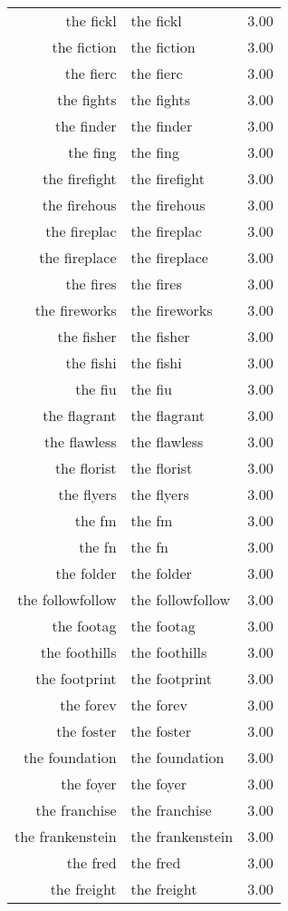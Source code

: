 \begin{table}[ht]
\begin{tabular}{rlr}
  the fickl & the fickl & 3.00 \\ 
  the fiction & the fiction & 3.00 \\ 
  the fierc & the fierc & 3.00 \\ 
  the fights & the fights & 3.00 \\ 
  the finder & the finder & 3.00 \\ 
  the fing & the fing & 3.00 \\ 
  the firefight & the firefight & 3.00 \\ 
  the firehous & the firehous & 3.00 \\ 
  the fireplac & the fireplac & 3.00 \\ 
  the fireplace & the fireplace & 3.00 \\ 
  the fires & the fires & 3.00 \\ 
  the fireworks & the fireworks & 3.00 \\ 
  the fisher & the fisher & 3.00 \\ 
  the fishi & the fishi & 3.00 \\ 
  the fiu & the fiu & 3.00 \\ 
  the flagrant & the flagrant & 3.00 \\ 
  the flawless & the flawless & 3.00 \\ 
  the florist & the florist & 3.00 \\ 
  the flyers & the flyers & 3.00 \\ 
  the fm & the fm & 3.00 \\ 
  the fn & the fn & 3.00 \\ 
  the folder & the folder & 3.00 \\ 
  the followfollow & the followfollow & 3.00 \\ 
  the footag & the footag & 3.00 \\ 
  the foothills & the foothills & 3.00 \\ 
  the footprint & the footprint & 3.00 \\ 
  the forev & the forev & 3.00 \\ 
  the foster & the foster & 3.00 \\ 
  the foundation & the foundation & 3.00 \\ 
  the foyer & the foyer & 3.00 \\ 
  the franchise & the franchise & 3.00 \\ 
  the frankenstein & the frankenstein & 3.00 \\ 
  the fred & the fred & 3.00 \\ 
  the freight & the freight & 3.00 \\ 

\end{tabular}
\end{table}
